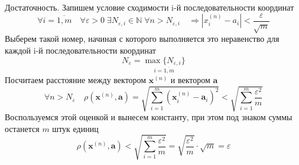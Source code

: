 \begin{enumerate}
  Достаточность. Запишем условие сходимости i-й последовательности координат
  $$
  \forall i = \overline{1,m} \quad \forall \varepsilon > 0 \; \exists N_{\varepsilon, i} \in \mathbb {N} \; \forall n > N_{\varepsilon, i} \quad \Rightarrow |x^{(n)}_i - a_i| < \frac{\varepsilon}{\sqrt{m}}
  $$
  Выберем такой номер, начиная с которого выполняется это неравенство для каждой i-й последовательности координат
  $$
  N_{\varepsilon} = \underset{i=\overline{1, m}}{\max\{N_{\varepsilon, i}\}}
  $$
  Посчитаем расстояние между вектором $\textbf {x}^{(n)}$ и вектором $\textbf {a}$
  $$
  \forall n > N_{\varepsilon} \quad \rho(\textbf {x}^{(n)}, \textbf {a}) = \sqrt{\sum\limits_{i=1}^m (\textbf {x}^{(n)}_i - \textbf {a}_i)^2} < \sqrt{\sum\limits_{i=1}^m \frac{{\varepsilon}^2}{m}}
  $$
  Воспользуемся этой оценкой и вынесем константу, при этом под знаком суммы останется $m$ штук единиц
  $$
  \rho(\textbf {x}^{(n)}, \textbf {a}) < \sqrt{\sum\limits_{i=1}^m \frac{{\varepsilon}^2}{m}} = \sqrt{\frac{{\varepsilon}^2}{m}} \cdot \sqrt{m} = \varepsilon
  $$
\end{enumerate}